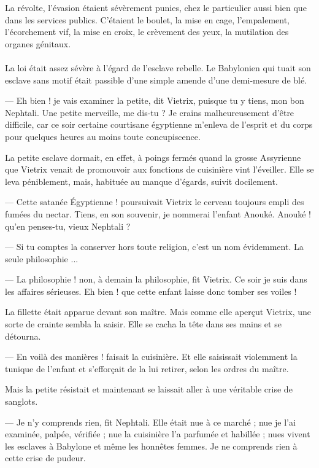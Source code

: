 \documentclass[a4paper, 11pt, oneside, polutonikogreek, french]{article}
\begin{document}
La révolte, l'évasion étaient sévèrement punies, chez le particulier aussi bien que dans les services publics. C'étaient le boulet, la mise en cage, l'empalement, l'écorchement vif, la mise en croix, le crèvement des yeux, la mutilation des organes génitaux.
\clearpage
\paragraph{}
La loi était assez sévère à l'égard de l'esclave rebelle. Le Babylonien qui tuait son esclave sans motif était passible d'une simple amende d'une demi-mesure de blé.

\bigskip
\centerline{\EightStarTaper}
\centerline{\EightStarTaper\EightStarTaper}
\bigskip

--- Eh bien ! je vais examiner la petite, dit Vietrix, puisque tu y tiens, mon bon Nephtali. Une petite merveille, me dis-tu ? Je crains malheureusement d'être difficile, car ce soir certaine courtisane égyptienne m'enleva de l'esprit et du corps pour quelques heures au moins toute concupiscence.

La petite esclave dormait, en effet, à poings fermés quand la grosse Assyrienne que Vietrix venait de promouvoir aux fonctions de cuisinière vint l'éveiller. Elle se leva péniblement, mais, habituée au manque d'égards, suivit docilement.

--- Cette satanée Égyptienne ! poursuivait Vietrix le cerveau toujours empli des fumées du nectar. Tiens, en son souvenir, je nommerai l'enfant Anouké. Anouké ! qu'en penses-tu, vieux Nephtali ?

--- Si tu comptes la conserver hors toute religion, c'est un nom évidemment. La seule philosophie ...

--- La philosophie ! non, à demain la philosophie, fit Vietrix. Ce soir je suis dans les affaires sérieuses. Eh bien ! que cette enfant laisse donc tomber ses voiles !

La fillette était apparue devant son maître. Mais comme elle aperçut Vietrix, une sorte de crainte sembla la saisir. Elle se cacha la tête dans ses mains et se détourna.

--- En voilà des manières ! faisait la cuisinière. Et elle saisissait violemment la tunique de l'enfant et s'efforçait de la lui retirer, selon les ordres du maître.

Mais la petite résistait et maintenant se laissait aller à une véritable crise de sanglots.

--- Je n'y comprends rien, fit Nephtali. Elle était nue à ce marché ; nue je l'ai examinée, palpée, vérifiée ; nue la cuisinière l'a parfumée et habillée ; nues vivent les esclaves à Babylone et même les honnêtes femmes. Je ne comprends rien à cette crise de pudeur.
\end{document}
